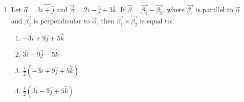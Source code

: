 \begin{enumerate}[label=\arabic*.,ref=\thesubsection.\theenumi]
\item Let $\overrightarrow{\alpha} = 3\hat{i + \hat{j}}$ and $\overrightarrow{\beta} = 2\hat{i} - \hat{j} + 3\hat{k}$. If $\overrightarrow{\beta} = \overrightarrow{\beta_1} - \overrightarrow{\beta_2}$, where $\overrightarrow{\beta_1}$ is parallel to $\overrightarrow{\alpha}$ and $\overrightarrow{\beta_2}$ is perpendicular to $\overrightarrow{\alpha}$, then $\overrightarrow{\beta_1} \times \overrightarrow{\beta_2}$ is equal to:
\begin{enumerate}
\item $-3\hat{i} + 9\hat{j} + 5\hat{k}$
\item $3\hat{i} - 9\hat{j} - 5\hat{k}$
\item $\frac{1}{2}(-3\hat{i} + 9\hat{j} + 5\hat{k})$
\item $\frac{1}{2}(3\hat{i} - 9\hat{j} + 5\hat{k})$
\end{enumerate}








\end{enumerate}




